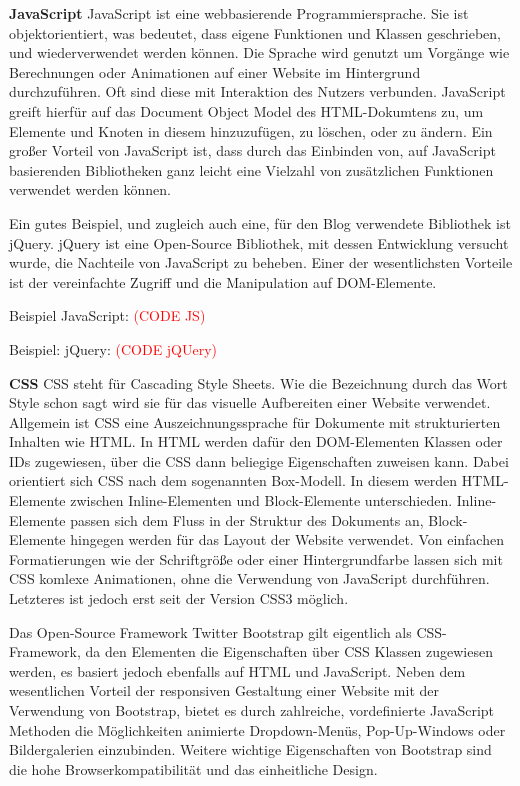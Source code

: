     \textbf{JavaScript}
    {JavaScript\cite{javascript}} ist eine webbasierende Programmiersprache. Sie ist objektorientiert, was bedeutet, dass eigene Funktionen und Klassen geschrieben, und wiederverwendet
    werden können. Die Sprache wird genutzt um Vorgänge wie Berechnungen oder Animationen auf einer Website im Hintergrund durchzuführen. Oft sind diese mit Interaktion
    des Nutzers verbunden. JavaScript greift hierfür auf das Document Object Model des HTML-Dokumtens zu, um Elemente und Knoten in diesem hinzuzufügen, zu löschen, oder
    zu ändern. Ein großer Vorteil von JavaScript ist, dass durch das Einbinden von, auf JavaScript basierenden Bibliotheken ganz leicht eine Vielzahl von zusätzlichen Funktionen
    verwendet werden können.

    Ein gutes Beispiel, und zugleich auch eine, für den Blog verwendete Bibliothek ist {jQuery\cite{jquery}}.
    jQuery ist eine Open-Source Bibliothek, mit dessen Entwicklung versucht wurde, die Nachteile von JavaScript zu beheben. Einer der wesentlichsten Vorteile ist
    der vereinfachte Zugriff und die Manipulation auf DOM-Elemente.

    Beispiel JavaScript:
    \textcolor{red}{(CODE JS)}

    Beispiel: jQuery:
    \textcolor{red}{(CODE jQUery)}

    \textbf{CSS}
    {CSS\cite{css}} steht für Cascading Style Sheets. Wie die Bezeichnung durch das Wort Style schon sagt wird sie für das visuelle Aufbereiten einer Website verwendet.
    Allgemein ist CSS eine Auszeichnungssprache für Dokumente mit strukturierten Inhalten wie HTML. In HTML werden dafür den DOM-Elementen Klassen oder IDs
    zugewiesen, über die CSS dann beliegige Eigenschaften zuweisen kann. Dabei orientiert sich CSS nach dem sogenannten Box-Modell. In diesem werden HTML-Elemente
    zwischen Inline-Elementen und Block-Elemente unterschieden. Inline-Elemente passen sich dem Fluss in der Struktur des Dokuments an, Block-Elemente hingegen
    werden für das Layout der Website verwendet. Von einfachen Formatierungen wie der Schriftgröße oder einer Hintergrundfarbe lassen sich mit CSS komlexe Animationen,
    ohne die Verwendung von JavaScript durchführen. Letzteres ist jedoch erst seit der Version CSS3 möglich.

    Das Open-Source Framework {Twitter Bootstrap\cite{bootstrap}} gilt eigentlich als CSS-Framework, da den Elementen die Eigenschaften über CSS Klassen zugewiesen werden, es basiert jedoch
    ebenfalls auf HTML und JavaScript. Neben dem wesentlichen Vorteil der responsiven Gestaltung einer Website mit der Verwendung von Bootstrap, bietet es durch
    zahlreiche, vordefinierte JavaScript Methoden die Möglichkeiten animierte Dropdown-Menüs, Pop-Up-Windows oder Bildergalerien einzubinden.
    Weitere wichtige Eigenschaften von Bootstrap sind die hohe Browserkompatibilität und das einheitliche Design.

